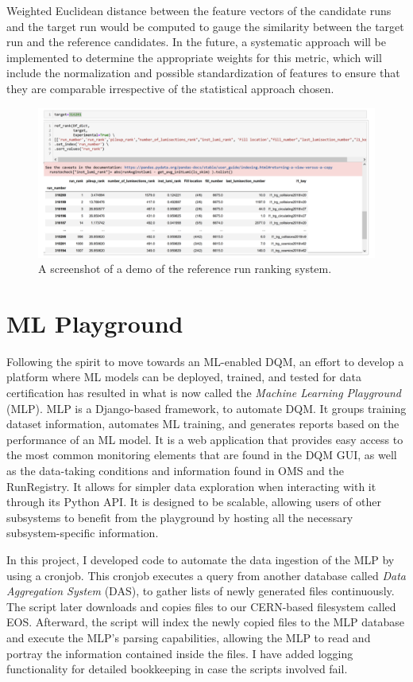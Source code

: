 Weighted Euclidean distance between the feature vectors of the candidate runs and the target run would be computed to gauge the similarity between the target run and the reference candidates. In the future, a systematic approach will be implemented to determine the appropriate weights for this metric, which will include the normalization and possible standardization of features to ensure that they are comparable irrespective of the statistical approach chosen.


\begin{figure}
	\centering
	\includegraphics[width=\linewidth]{Images/ranking.png}
	\caption{A screenshot of a demo of the reference run ranking system.}
	\label{fig:ranking}
\end{figure}


\section{ML Playground}\label{sect:MLP}
Following the spirit to move towards an ML-enabled DQM, an effort to develop a platform where ML models can be deployed, trained, and tested for data certification has resulted in what is now called the \textit{Machine Learning Playground} (MLP). MLP is a Django-based framework, to automate DQM\cite{Wachirapusitan_2023}. It groups training dataset information, automates ML training, and generates reports based on the performance of an ML model. It is a web application that provides easy access to the most common monitoring elements that are found in the DQM GUI, as well as the data-taking conditions and information found in OMS and the RunRegistry. It allows for simpler data exploration when interacting with it through its Python API. It is designed to be scalable, allowing users of other subsystems to benefit from the playground by hosting all the necessary subsystem-specific information.

In this project, I developed code to automate the data ingestion of the MLP by using a cronjob. This cronjob executes a query from another database called \textit{Data Aggregation System} (DAS), to gather lists of newly generated files continuously. The script later downloads and copies files to our CERN-based filesystem called EOS. Afterward, the script will index the newly copied files to the MLP database and execute the MLP's parsing capabilities, allowing the MLP to read and portray the information contained inside the files.
I have added logging functionality for detailed bookkeeping in case the scripts involved fail.


